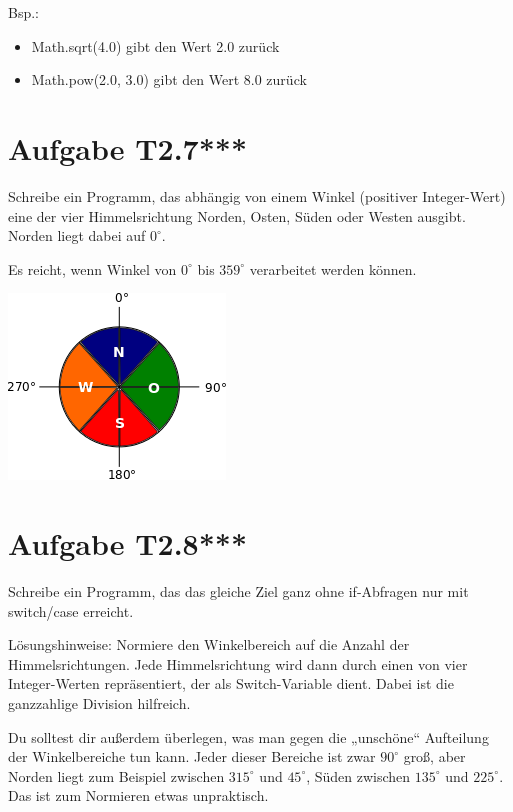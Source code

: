 \documentclass[final,a4paper]{article}
\begin{document}
Bsp.: 
\begin{itemize}
\item Math.sqrt(4.0) gibt den Wert 2.0 zurück
\item Math.pow(2.0, 3.0) gibt den Wert 8.0 zurück
\end{itemize}

\clearpage
\section*{Aufgabe T2.7***}
Schreibe ein Programm, das abhängig von einem Winkel (positiver Integer-Wert) eine der vier Himmelsrichtung Norden, Osten, Süden oder Westen ausgibt. Norden liegt dabei auf \(0^\circ\). 

Es reicht, wenn Winkel von \(0^\circ\) bis \(359^\circ\) verarbeitet werden können.


\includegraphics{aufgabe_2_7_kompass.png}

\section*{Aufgabe T2.8***}
Schreibe ein Programm, das das gleiche Ziel ganz ohne if-Abfragen nur mit switch/case erreicht.

Lösungshinweise: Normiere den Winkelbereich auf die Anzahl der Himmelsrichtungen. Jede Himmelsrichtung wird dann durch einen von vier Integer-Werten repräsentiert, der als Switch-Variable dient. Dabei ist die ganzzahlige Division hilfreich.

Du solltest dir außerdem überlegen, was man gegen die „unschöne“ Aufteilung der Winkelbereiche tun kann. Jeder dieser Bereiche ist zwar \(90^\circ\) groß, aber Norden liegt zum Beispiel zwischen \(315^\circ\) und \(45^\circ\), Süden zwischen \(135^\circ\) und \(225^\circ\). Das ist zum Normieren etwas unpraktisch.
\end{document}
